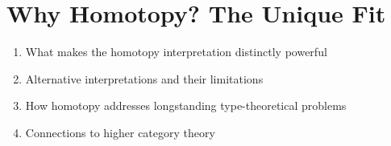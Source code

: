 \section{Why Homotopy? The Unique Fit}\label{sec:answer}

\begin{enumerate}
    \item What makes the homotopy interpretation distinctly powerful
    \item Alternative interpretations and their limitations
    \item How homotopy addresses longstanding type-theoretical problems
    \item Connections to higher category theory
\end{enumerate}


